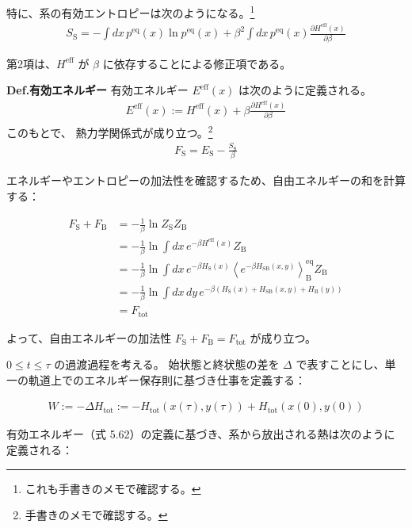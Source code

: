 \documentclass[a4paper,11pt]{jsarticle}
\numberwithin{equation}{section}
\begin{document}
特に、系の有効エントロピーは次のようになる。\footnote{これも手書きのメモで確認する。}
\begin{align}
S_{\text{S}} = - \int dx\, p^{\mathrm{eq}}(x) \ln p^{\mathrm{eq}}(x)
+ \beta^2 \int dx\, p^{\mathrm{eq}}(x) \frac{\partial H^{\mathrm{eff}}(x)}{\partial \beta}
\end{align}

第2項は、$H^{\mathrm{eff}}$ が $\beta$ に依存することによる修正項である。

\begin{itembox}[l]{\textbf{Def.有効エネルギー}}
有効エネルギー $E^{\mathrm{eff}}(x)$ は次のように定義される。
\begin{align}
E^{\mathrm{eff}}(x) := H^{\mathrm{eff}}(x) + \beta \frac{\partial H^{\mathrm{eff}}(x)}{\partial \beta}
\end{align}
このもとで、
熱力学関係式が成り立つ。\footnote{手書きのメモで確認する。}
\begin{align}
F_{\text{S}} = E_{\text{S}} - \frac{S_{\text{S}}}{\beta}
\end{align}
\end{itembox}
エネルギーやエントロピーの加法性を確認するため、自由エネルギーの和を計算する：

\begin{align}
F_{\text{S}} + F_{\text{B}} &= -\frac{1}{\beta} \ln Z_{\text{S}} Z_{\text{B}} \\
&= -\frac{1}{\beta} \ln \int dx\, e^{-\beta H^{\mathrm{eff}}(x)} Z_{\text{B}} \\
&= -\frac{1}{\beta} \ln \int dx\, e^{-\beta H_{\text{S}}(x)} \left\langle e^{-\beta H_{\text{SB}}(x,y)} \right\rangle_{\text{B}}^{\mathrm{eq}} Z_{\text{B}} \\
&= -\frac{1}{\beta} \ln \int dx\, dy\, e^{-\beta (H_{\text{S}}(x) + H_{\text{SB}}(x,y) + H_{\text{B}}(y))} \\
&= F_{\text{tot}}
\end{align}

よって、自由エネルギーの加法性 $F_{\text{S}} + F_{\text{B}} = F_{\text{tot}}$ が成り立つ。

$0 \leq t \leq \tau$ の過渡過程を考える。  
始状態と終状態の差を $\Delta$ で表すことにし、単一の軌道上でのエネルギー保存則に基づき仕事を定義する：

\begin{align}
W := -\Delta H_{\text{tot}} := -H_{\text{tot}}(x(\tau), y(\tau)) + H_{\text{tot}}(x(0), y(0))
\end{align}

有効エネルギー（式 5.62）の定義に基づき、系から放出される熱は次のように定義される：
\end{document}
